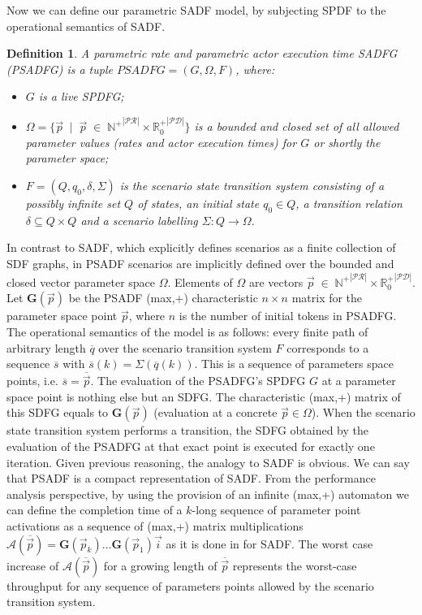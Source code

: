 \documentclass[]{eptcs}
\newtheorem{mydef}{Definition}
\begin{document}
Now we can define our parametric SADF model, by subjecting SPDF to the operational semantics of SADF.
\begin{mydef}
A parametric rate and parametric actor execution time SADFG (PSADFG) is a tuple  $\mathit{PSADFG}=(G, \Omega, F)$, where:
\begin{itemize}
\item $G$ is a live SPDFG;
\item $\Omega = \{ \vec{p} \; \mid \; \vec{p} \; \in \; {\mathbb{N}^{+}}^{|\mathcal{PR}|} \times  {\mathbb{R}^{+}_{0}}^{|\mathcal{PD}|} \}$ is a bounded and closed set of all allowed parameter values (rates and actor execution times) for $G$ or shortly the parameter space;
\item $F=(Q,{q_0}, \delta, \Sigma)$ is the scenario state transition system consisting of a possibly infinite set $Q$ of states, an initial state ${q_0} \in Q$, a transition relation $\delta \subseteq Q \times Q$ and a scenario labelling $\Sigma:  Q \rightarrow \Omega$.
\end{itemize}
\end{mydef}
In contrast to SADF, which explicitly defines scenarios as a finite collection of SDF graphs, in PSADF scenarios are implicitly defined over the bounded and closed vector parameter space $\Omega$. Elements of $\Omega$ are vectors $\vec{p} \; \in \; {\mathbb{N}^{+}}^{|\mathcal{PR}|} \times {\mathbb{R}^{+}_{0}}^{|\mathcal{PD}|}$. Let $\mathbf{G}(\vec{p})$ be the PSADF (max,+) characteristic $n\times n$ matrix for the parameter space point $\vec{p}$, where $n$ is the number of initial tokens in PSADFG.
The operational semantics of the model is as follows: every finite path of arbitrary length $\overline{q}$ over the scenario transition system $F$ corresponds to a sequence $\overline{s}$ with $\overline{s}(k)=\Sigma(\overline{q}(k))$. This is a sequence of parameters space points, i.e. $\overline{s}=\overline{\vec{p}}$. The evaluation of the PSADFG's SPDFG $G$ at a parameter space point is nothing else but an SDFG. The characteristic (max,+) matrix of this SDFG equals to $\mathbf{G}(\vec{p})$ (evaluation at a concrete $\vec{p} \in \Omega$). When the scenario state transition system performs a transition, the SDFG obtained by the evaluation of the PSADFG at that exact point is executed for exactly one iteration. Given previous reasoning, the analogy to SADF is obvious. We can say that PSADF is a compact representation of SADF. From the performance analysis perspective, by using the provision of an infinite (max,+) automaton \cite{2gaub} we can define the completion time of a $k$-long sequence of parameter point activations as a sequence of (max,+) matrix multiplications $\mathcal{A}(\overline{\vec{p}})=\mathbf{G}(\vec{p}_k)\ldots\mathbf{G}(\vec{p}_1)\vec{i}$ as it is done in \cite{2geil:all} for SADF. The worst case increase of $\mathcal{A}(\overline{\vec{p}})$ for a growing length of $\overline{\vec{p}}$ represents the worst-case throughput for any sequence of parameters points allowed by the scenario transition system.
\end{document}
